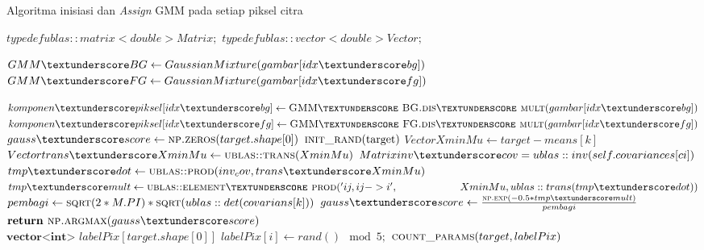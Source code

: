 \begin{algorithm}                     
    \caption{Algoritma inisiasi dan \emph{Assign} GMM pada setiap piksel citra}          
    \label{algo:assign_GMM}                          
    \begin{algorithmic}                    %

    \State $typedef ublas::matrix<double> Matrix;$
    \State $typedef ublas::vector<double> Vector;$

        \State $GMM\textunderscore BG \gets GaussianMixture(gambar[idx\textunderscore bg])$
        \State $GMM\textunderscore FG \gets GaussianMixture(gambar[idx\textunderscore fg])$

        \State $komponen\textunderscore piksel[idx\textunderscore bg] \gets \Call{GMM\textunderscore BG.dis\textunderscore mult}{gambar[idx\textunderscore bg]}$
        \State $komponen\textunderscore piksel[idx\textunderscore fg] \gets \Call{GMM\textunderscore FG.dis\textunderscore mult}{gambar[idx\textunderscore fg]}$
    \EndFunction
    \\
     
        \State $gauss\textunderscore score \gets  \Call{np.zeros}{target.shape[0]}$
        \State $\Call{init\textunderscore rand}{$target$}$
                \State $Vector XminMu \gets target - means[k]$
                \State $Vector trans\textunderscore XminMu \gets \Call{ublas::trans}{XminMu}$
                \State $Matrix inv\textunderscore cov = ublas::inv(self.covariances[ci])$
                \State $tmp\textunderscore dot \gets \Call{ublas::prod}{inv_cov, trans\textunderscore XminMu}$
                \State $tmp\textunderscore mult \gets \Call{ublas::element\textunderscore prod}{'ij,ij->i', \newline 
                \hspace*{6em} XminMu, ublas::trans(tmp\textunderscore dot)}$
                \State $pembagi \gets \Call{sqrt}{2* M.PI} * \Call{sqrt}{ublas::det(covarians[k])}$
                \State $gauss\textunderscore score \gets \frac{\Call{np.exp}{-0.5 * tmp\textunderscore mult}}{pembagi}$
            \EndIf
        \EndFor
        \State $\textbf{return } \Call{np.argmax}{gauss\textunderscore score}$
    \EndFunction
    \\
        \State $\textbf{vector<int> } labelPix[target.shape[0]]$
            \State $labelPix[i] \gets rand() \mod 5;$
        \EndFor
        \State $\Call{count\textunderscore params}{target, labelPix}$
    \EndFunction
    \end{algorithmic}
\end{algorithm}


